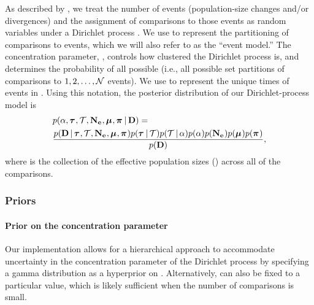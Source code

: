 \begin{linenomath}
As described by \citet{Oaks2018ecoevolity},
we treat the number of events (population-size changes and/or divergences)
and the assignment of comparisons to those events as
random variables under a Dirichlet process \citep{Ferguson1973,
    Antoniak1974}.
We use \etimesets to represent the partitioning of comparisons to events,
which we will also refer to as the ``event model.''
The concentration parameter, \concentration, controls how clustered the
Dirichlet process is, and determines the probability of all possible \etimesets
(i.e., all possible set partitions of \ncomparisons comparisons to $1, 2, \ldots, \mathcal{N}$ events).
We use \etimes to represent the unique times of events in \etimesets.
Using this notation, the posterior distribution of our 
Dirichlet-process model is
\begin{equation}
\begin{split}
    & \pr(
    \concentration,
    \etimes,
    \etimesets,
    \collectionpopsizes,
    \murates,
    \gfreqs
    \given
    \alldata
    )
    = \\
    & \frac{
        \pr(
        \alldata
        \given
        \etimes,
        \etimesets,
        \collectionpopsizes,
        \murates,
        \gfreqs
        )
        \pr(\etimes \given \etimesets)%
        \pr(\etimesets \given \concentration)
        \pr(\concentration)
        \pr(\collectionpopsizes)
        \pr(\murates)
        \pr(\gfreqs)
    }{
        \pr(
        \alldata%
        )
    },
    \label{eq:bayesruleexpanded}
\end{split}
\end{equation}
where
\collectionpopsizes
is the collection of the effective population sizes (\comparisonpopsizes{})
across all of the comparisons.
\end{linenomath}

\subsubsection{Priors}

\paragraph{Prior on the concentration parameter}
Our implementation allows for a hierarchical approach to accommodate
uncertainty in the concentration parameter of the Dirichlet process
by specifying a gamma distribution as a hyperprior on
\concentration \citep{Escobar1995,Heath2011}.
Alternatively, \concentration can also be fixed to a particular value,
which is likely sufficient when the number of comparisons is small.

